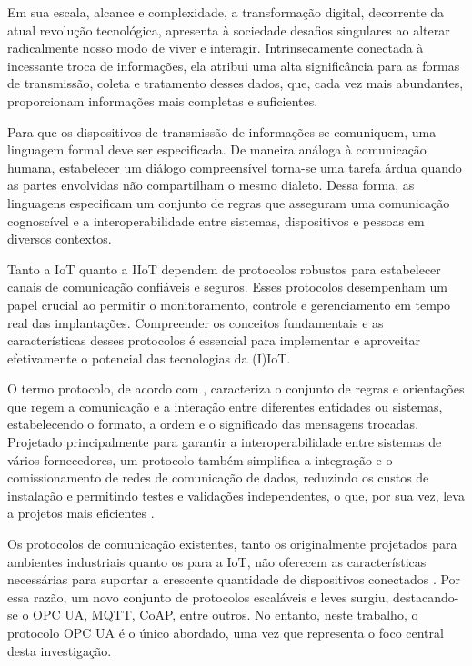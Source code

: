     Em sua escala, alcance e complexidade, a transformação digital, decorrente da atual revolução tecnológica, apresenta à sociedade desafios singulares ao alterar radicalmente nosso modo de viver e interagir. Intrinsecamente conectada à incessante troca de informações, ela atribui uma alta significância para as formas de transmissão, coleta e tratamento desses dados, que, cada vez mais abundantes, proporcionam informações mais completas e suficientes.

    Para que os dispositivos de transmissão de informações se comuniquem, uma linguagem formal deve ser especificada. De maneira análoga à comunicação humana, estabelecer um diálogo compreensível torna-se uma tarefa árdua quando as partes envolvidas não compartilham o mesmo dialeto. Dessa forma, as linguagens especificam um conjunto de regras que asseguram uma comunicação cognoscível e a interoperabilidade entre sistemas, dispositivos e pessoas em diversos contextos.

    Tanto a IoT quanto a IIoT dependem de protocolos robustos para estabelecer canais de comunicação confiáveis e seguros. Esses protocolos desempenham um papel crucial ao permitir o monitoramento, controle e gerenciamento em tempo real das implantações. Compreender os conceitos fundamentais e as características desses protocolos é essencial para implementar e aproveitar efetivamente o potencial das tecnologias da (I)IoT.

    O termo protocolo, de acordo com \cite{persson2015}, caracteriza o conjunto de regras e orientações que regem a comunicação e a interação entre diferentes entidades ou sistemas, estabelecendo o formato, a ordem e o significado das mensagens trocadas. Projetado principalmente para garantir a interoperabilidade entre sistemas de vários fornecedores, um protocolo também simplifica a integração e o comissionamento de redes de comunicação de dados, reduzindo os custos de instalação e permitindo testes e validações independentes, o que, por sua vez, leva a projetos mais eficientes \cite{mohagheghi2009}.

    Os protocolos de comunicação existentes, tanto os originalmente projetados para ambientes industriais quanto os para a IoT, não oferecem as características necessárias para suportar a crescente quantidade de dispositivos conectados \cite{markel2017}. Por essa razão, um novo conjunto de protocolos escaláveis e leves surgiu, destacando-se o OPC UA, MQTT, CoAP, entre outros. No entanto, neste trabalho, o protocolo OPC UA é o único abordado, uma vez que representa o foco central desta investigação.
        
